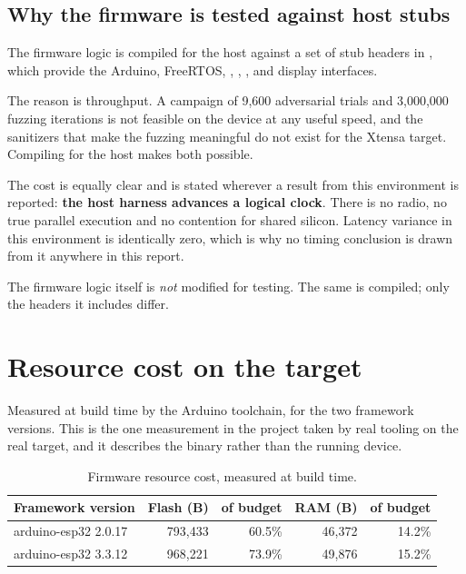 \subsection{Why the firmware is tested against host stubs}

The firmware logic is compiled for the host against a set of stub headers in
, which provide the Arduino, FreeRTOS, , ,
,  and display interfaces.

The reason is throughput. A campaign of 9,600 adversarial trials and 3,000,000 fuzzing
iterations is not feasible on the device at any useful speed, and the sanitizers that make the
fuzzing meaningful do not exist for the Xtensa target. Compiling for the host makes both
possible.

The cost is equally clear and is stated wherever a result from this environment is reported:
\textbf{the host harness advances a logical clock}. There is no radio, no true parallel
execution and no contention for shared silicon. Latency variance in this environment is
identically zero, which is why no timing conclusion is drawn from it anywhere in this report.

The firmware logic itself is \emph{not} modified for testing. The same  is
compiled; only the headers it includes differ.

\section{Resource cost on the target}

Measured at build time by the Arduino toolchain, for the two framework versions. This is the one
measurement in the project taken by real tooling on the real target, and it describes the binary
rather than the running device.

\begin{table}[htbp]
\centering
\caption[Firmware resource cost]{Firmware resource cost, measured at build time.}
\label{tab:rep-build}
\begin{tabular}{@{}lrrrr@{}}
\toprule
Framework version & Flash (B) & of budget & RAM (B) & of budget \\
\midrule
arduino-esp32 2.0.17 & 793{,}433 & 60.5\% & 46{,}372 & 14.2\% \\
arduino-esp32 3.3.12 & 968{,}221 & 73.9\% & 49{,}876 & 15.2\% \\
\bottomrule
\end{tabular}
\end{table}

